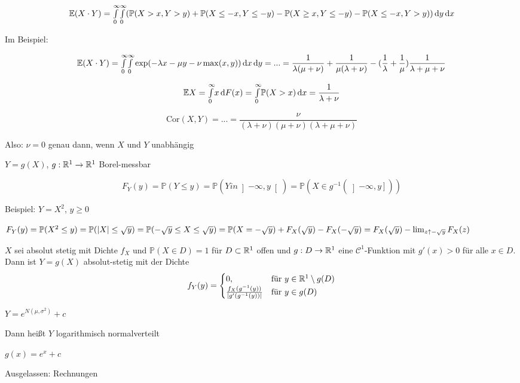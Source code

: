 \documentclass{cheat-sheet}
\renewcommand{\P}{\mathbb{P}} %
\newcommand{\E}{\mathbb{E}} %
\newcommand{\cor}{\mathrm{Cor}} %
\begin{document}
\[ \E (X \cdot Y) = \Int{0}{\infty}{\Int{0}{\infty}{(\P(X > x, Y > y) + \P(X \leq -x, Y \leq -y) - \P(X \geq x, Y \leq -y) - \P(X \leq -x, Y > y))}{y}}{x} \]

Im Beispiel:

\[ \E (X \cdot Y) = \Int{0}{\infty}{\Int{0}{\infty}{\exp(-\lambda x - \mu y - \nu \max(x,y))}{x}}{y} = ... = \frac{1}{\lambda (\mu + \nu)} + \frac{1}{\mu (\lambda + \nu)} - (\frac{1}{\lambda} + \frac{1}{\mu}) \frac{1}{\lambda + \mu + \nu} \]

\[ \E X = \Int{0}{\infty}{x}{F(x)} = \Int{0}{\infty}{\P(X > x)}{x} = \frac{1}{\lambda + \nu} \]

\[ \cor(X,Y) = ... = \frac{\nu}{(\lambda + \nu) (\mu + \nu) (\lambda + \mu + \nu)} \]

Also: $\nu = 0$ genau dann, wenn $X$ und $Y$ unabhängig



$Y = g(X)$, $g : \mathbb{R}^1 \to \mathbb{R}^1$ Borel-messbar

\[ F_Y(y) = \P(Y \leq y) = \P(Y in \left] -\infty, y \right[) = \P(X \in g^{-1}(\left] -\infty, y \right])) \]

Beispiel: $Y = X^2$, $y \geq 0$

$F_Y(y) = \P(X^2 \leq y) = \P(\abs{X} \leq \sqrt{y}) = \P(-\sqrt{y} \leq X \leq \sqrt{y}) = \P(X = -\sqrt{y}) + F_X(\sqrt{y}) - F_X(-\sqrt{y}) = F_X(\sqrt{y}) - \lim_{z \uparrow -\sqrt{y}} F_X(z)$

\begin{satz}
  $X$ sei absolut stetig mit Dichte $f_X$ und $\P(X \in D) = 1$ für $D \subset \mathbb{R}^1$ offen und $g : D \to \mathbb{R}^1$ eine $\mathcal{C}^1$-Funktion mit $g'(x) > 0$ für alle $x \in D$. Dann ist $Y = g(X)$ absolut-stetig mit der Dichte
  \[ f_Y(y) = \begin{cases} 0, & \text{für } y \in \mathbb{R}^1 \setminus g(D) \\ \frac{f_X(g^{-1}(y))}{\lvert g'(g^{-1}(y))\rvert} & \text{für } y \in g(D) \end{cases} \]
\end{satz}

\begin{bsp}
  $Y = e^{N (\mu, \sigma^2)} + c$

  Dann heißt $Y$ logarithmisch normalverteilt

  $g(x) = e^x + c$

  Ausgelassen: Rechnungen
\end{bsp}
\end{document}

